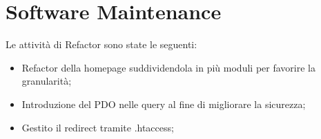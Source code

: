 \documentclass[12pt]{article}
\begin{document}
\section{Software Maintenance}

Le attività di Refactor sono state le seguenti:
\begin{itemize}
  \item Refactor della homepage suddividendola in più moduli per favorire la granularità;
  \item Introduzione del PDO nelle query al fine di migliorare la sicurezza;
  \item Gestito il redirect tramite .htaccess;
\end{itemize}
\end{document}
